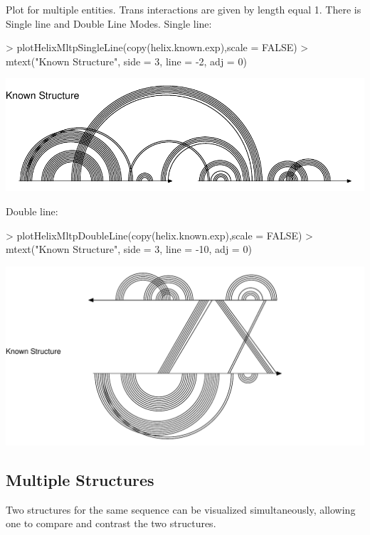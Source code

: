 \documentclass[letterpaper]{article}
\begin{document}
Plot for multiple entities. Trans interactions are given by length equal 1.
There is Single line and Double Line Modes.
Single line:

\begin{Schunk}
\begin{Sinput}
> plotHelixMltpSingleLine(copy(helix.known.exp),scale = FALSE)
> mtext("Known Structure", side = 3, line = -2, adj = 0)
\end{Sinput}
\end{Schunk}
\includegraphics{R4RNA-004}

Double line:
\begin{Schunk}
\begin{Sinput}
> plotHelixMltpDoubleLine(copy(helix.known.exp),scale = FALSE)
> mtext("Known Structure", side = 3, line = -10, adj = 0)
\end{Sinput}
\end{Schunk}
\includegraphics{R4RNA-005}


\subsection{Multiple Structures}

Two structures for the same sequence can be visualized simultaneously, allowing
one to compare and contrast the two structures.
\end{document}
